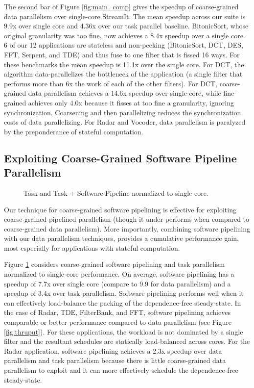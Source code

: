 The second bar of Figure \ref{fig:main_comp} gives the speedup of
coarse-grained data parallelism over single-core StreamIt. The mean
speedup across our suite is 9.9x over single core and 4.36x over our
task parallel baseline.  BitonicSort, whose original granularity was
too fine, now achieves a 8.4x speedup over a single core. 6 of our 12
applications are stateless and non-peeking (BitonicSort, DCT, DES,
FFT, Serpent, and TDE) and thus fuse to one filter that is fissed 16
ways.  For these benchmarks the mean speedup is 11.1x over the
single core.  For DCT, the algorithm data-parallelizes the bottleneck
of the application (a single filter that performs more than 6x the
work of each of the other filters).  For DCT, coarse-grained data
parallelism achieves a 14.6x speedup over single-core, while
fine-grained achieves only 4.0x because it fisses at too fine a
granularity, ignoring synchronization.  Coarsening and then
parallelizing reduces the synchronization costs of data parallelizing.
For Radar and Vocoder, data parallelism is paralyzed by the
preponderance of stateful computation.

\subsection{Exploiting Coarse-Grained Software Pipeline Parallelism}

\begin{figure}[t]
\centering
{}
\caption{Task and Task + Software Pipeline normalized to single core.
\protect\label{fig:softpipe_graph}}
\end{figure}
Our technique for coarse-grained software pipelining is effective for
exploiting coarse-grained pipelined parallelism (though it
under-performs when compared to coarse-grained data parallelism).
More importantly, combining software pipelining with our data
parallelism techniques, provides a cumulative performance gain, most
especially for applications with stateful computation.

Figure \ref{fig:softpipe_graph} considers coarse-grained software
pipelining and task parallelism normalized to single-core performance.
On average, software pipelining has a speedup of 7.7x over single core
(compare to 9.9 for data parallelism) and a speedup of 3.4x over task
parallelism. Software pipelining performs well when it can effectively
load-balance the packing of the dependence-free steady-state.  In the
case of Radar, TDE, FilterBank, and FFT, software pipelining achieves
comparable or better performance compared to data parallelism (see
Figure \ref{fig:thruput}).  For these applications, the workload is
not dominated by a single filter and the resultant schedules are
statically load-balanced across cores.  For the Radar application,
software pipelining achieves a 2.3x speedup over data parallelism and
task parallelism because there is little coarse-grained data
parallelism to exploit and it can more effectively schedule the
dependence-free steady-state.

